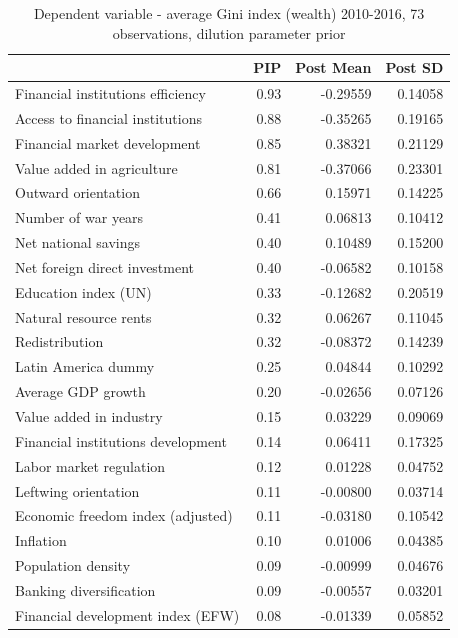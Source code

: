 \begin{refsection}
\begin{subappendices}
    \begin{table}[!ht]
    \footnotesize
    \centering
    \caption{Dependent variable - average Gini index (wealth) 2010-2016, 73 observations, dilution parameter prior}
    \label{ch3table:res3}
    \begin{tabular}{lrrr}
      \toprule
     & \ac{PIP} & Post Mean & Post SD \\ 
      \midrule
      Financial institutions efficiency & 0.93 & -0.29559 & 0.14058 \\ 
      Access to financial institutions & 0.88 & -0.35265 & 0.19165 \\ 
      Financial market development & 0.85 & 0.38321 & 0.21129 \\ 
      Value added in agriculture & 0.81 & -0.37066 & 0.23301 \\ 
      Outward orientation & 0.66 & 0.15971 & 0.14225 \\ 
      Number of war years & 0.41 & 0.06813 & 0.10412 \\ 
      Net national savings & 0.40 & 0.10489 & 0.15200 \\ 
      Net foreign direct investment & 0.40 & -0.06582 & 0.10158 \\ 
      Education index (UN) & 0.33 & -0.12682 & 0.20519 \\ 
      Natural resource rents & 0.32 & 0.06267 & 0.11045 \\ 
      Redistribution & 0.32 & -0.08372 & 0.14239 \\ 
      Latin America dummy & 0.25 & 0.04844 & 0.10292 \\ 
      Average GDP growth & 0.20 & -0.02656 & 0.07126 \\ 
      Value added in industry & 0.15 & 0.03229 & 0.09069 \\ 
      Financial institutions development & 0.14 & 0.06411 & 0.17325 \\ 
      Labor market regulation & 0.12 & 0.01228 & 0.04752 \\ 
      Leftwing orientation & 0.11 & -0.00800 & 0.03714 \\ 
      Economic freedom index (adjusted) & 0.11 & -0.03180 & 0.10542 \\ 
      Inflation & 0.10 & 0.01006 & 0.04385 \\ 
      Population density & 0.09 & -0.00999 & 0.04676 \\ 
      Banking diversification & 0.09 & -0.00557 & 0.03201 \\ 
      Financial development index (EFW) & 0.08 & -0.01339 & 0.05852 \\ 

\end{tabular}
\end{table}
\end{subappendices}
\end{refsection}
